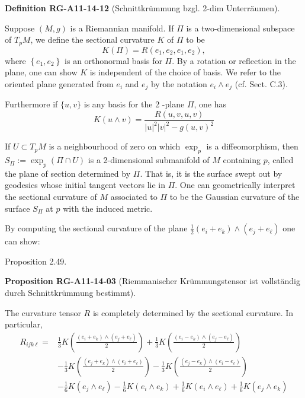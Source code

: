 \documentclass[10pt, letterpaper]{article}
\newcommand{\CustomHeading}[3]{%
  \par\medskip\noindent%
  \textbf{#1 #2} \textnormal{(#3)}.\enskip%
}
\newenvironment{DEF}[2]{\begin{unitbox}\CustomHeading{Definition}{#1}{#2}}{\end{unitbox}}
\newenvironment{PROP}[2]{\begin{unitbox}\CustomHeading{Proposition}{#1}{#2}}{\end{unitbox}}
\begin{document}
\begin{DEF}{RG-A11-14-12}{Schnittkrümmung bzgl. 2-dim Unterräumen}
Suppose $(M, g)$ is a Riemannian manifold. If $\Pi$ is a two-dimensional subspace of $T_{p} M$, we define the sectional curvature $K$ of $\Pi$ to be
$$
K(\Pi)=R\left(e_{1}, e_{2}, e_{1}, e_{2}\right),
$$
where $\left\{e_{1}, e_{2}\right\}$ is an orthonormal basis for $\Pi$. By a rotation or reflection in the plane, one can show $K$ is independent of the choice of basis. We refer to the oriented plane generated from $e_{i}$ and $e_{j}$ by the notation $e_{i} \wedge e_{j}$ (cf. Sect. C.3). 

Furthermore if $\{u, v\}$ is any basis for the 2 -plane $\Pi$, one has
$$
K(u \wedge v)=\frac{R(u, v, u, v)}{|u|^{2}|v|^{2}-g(u, v)^{2}}
$$
\end{DEF}



If $U \subset T_{p} M$ is a neighbourhood of zero on which $\exp _{p}$ is a diffeomorphism, then $S_{\Pi}:=\exp _{p}(\Pi \cap U)$ is a 2-dimensional submanifold of $M$ containing $p$, called the plane of section determined by $\Pi$. That is, it is the surface swept out by geodesics whose initial tangent vectors lie in $\Pi$. One can geometrically interpret the sectional curvature of $M$ associated to $\Pi$ to be the Gaussian curvature of the surface $S_{\Pi}$ at $p$ with the induced metric.

By computing the sectional curvature of the plane $\frac{1}{2}\left(e_{i}+e_{k}\right) \wedge\left(e_{j}+e_{\ell}\right)$ one can show:



Proposition 2.49. 

\begin{PROP}{RG-A11-14-03}{Riemmanischer Krümmungstensor ist vollständig durch Schnittkrümmung bestimmt}
The curvature tensor $R$ is completely determined by the sectional curvature. In particular,
$$
\begin{aligned}
R_{i j k \ell}= & \frac{1}{3} K\left(\frac{\left(e_{i}+e_{k}\right) \wedge\left(e_{j}+e_{\ell}\right)}{2}\right)+\frac{1}{3} K\left(\frac{\left(e_{i}-e_{k}\right) \wedge\left(e_{j}-e_{\ell}\right)}{2}\right) \\
& -\frac{1}{3} K\left(\frac{\left(e_{j}+e_{k}\right) \wedge\left(e_{i}+e_{\ell}\right)}{2}\right)-\frac{1}{3} K\left(\frac{\left(e_{j}-e_{k}\right) \wedge\left(e_{i}-e_{\ell}\right)}{2}\right) \\
& -\frac{1}{6} K\left(e_{j} \wedge e_{\ell}\right)-\frac{1}{6} K\left(e_{i} \wedge e_{k}\right)+\frac{1}{6} K\left(e_{i} \wedge e_{\ell}\right)+\frac{1}{6} K\left(e_{j} \wedge e_{k}\right)
\end{aligned}
$$
\end{PROP}
\end{document}
